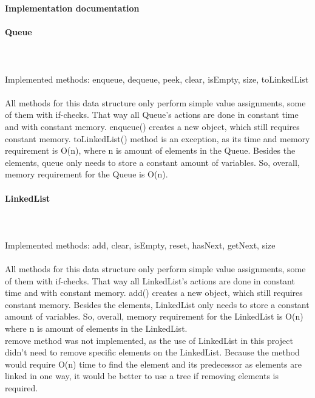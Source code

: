 \documentclass[a4paper,12pt]{article}
\begin{document}
\centerline{\huge \textbf{Implementation documentation}} \hspace*{\fill}

\paragraph{\large Queue} \hspace{0pt} \\
\\
Implemented methods: enqueue, dequeue, peek, clear, isEmpty, size, toLinkedList\\
\\
All methods for this data structure only perform simple value assignments, some of them with if-checks. That way all Queue's actions are done in constant time and with constant memory. enqueue() creates a new object, which still requires constant memory. toLinkedList() method is an exception, as its time and memory requirement is O(n), where n is amount of elements in the Queue. Besides the elements, queue only needs to store a constant amount of variables. So, overall, memory requirement for the Queue is O(n).
\\

\paragraph{\large LinkedList} \hspace{0pt} \\
\\
Implemented methods: add, clear, isEmpty, reset, hasNext, getNext, size\\
\\
All methods for this data structure only perform simple value assignments, some of them with if-checks. That way all LinkedList's actions are done in constant time and with constant memory. add() creates a new object, which still requires constant memory. Besides the elements, LinkedList only needs to store a constant amount of variables. So, overall, memory requirement for the LinkedList is O(n) where n is amount of elements in the LinkedList.\\
remove method was not implemented, as the use of LinkedList in this project didn't need to remove specific elements on the LinkedList. Because the method would require O(n) time to find the element and its predecessor as elements are linked in one way, it would be better to use a tree if removing elements is required.
\\
\end{document}
